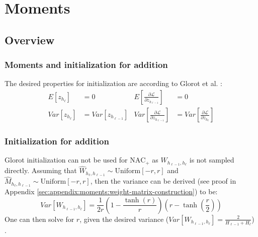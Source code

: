 \section{Moments}
\label{sec:appendix:moments}

\subsection{Overview}
\subsubsection{Moments and initialization for addition}
The desired properties for initialization are according to Glorot et al. \cite{glorot-initialization}:
\begin{equation}
\begin{aligned}
E[z_{h_\ell}] &= 0 & E\left[\frac{\partial \mathcal{L}}{\partial z_{h_{\ell-1}}}\right] &= 0 \\
Var[z_{h_\ell}] &= Var\left[z_{h_{\ell-1}}\right] &
Var\left[\frac{\partial \mathcal{L}}{\partial z_{h_{\ell-1}}}\right] &= Var\left[\frac{\partial \mathcal{L}}{\partial z_{h_{\ell}}}\right]
\end{aligned}
\end{equation}

\subsubsection{Initialization for addition}

Glorot initialization can not be used for $\mathrm{NAC}_{+}$ as $W_{h_{\ell-1},h_{\ell}}$ is not sampled directly. Assuming that $\hat{W}_{h_\ell, h_{\ell-1}} \sim \mathrm{Uniform}[-r, r]$ and $\hat{M}_{h_\ell, h_{\ell-1}} \sim \mathrm{Uniform}[-r, r]$, then the variance can be derived (see proof in Appendix \ref{sec:appendix:moments:weight-matrix-construction}) to be:
\begin{equation}
Var[W_{h_{\ell-1},h_{\ell}}] = \frac{1}{2r} \left(1 - \frac{\tanh(r)}{r}\right) \left(r - \tanh\left(\frac{r}{2}\right)\right)
\end{equation}
One can then solve for $r$, given the desired variance ($Var[W_
{h_{\ell-1},h_{\ell}}] = \frac{2}{H_{\ell-1} + H_{\ell}}$) \cite{glorot-initialization}.

